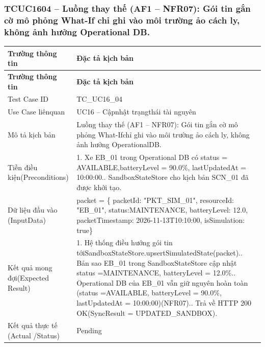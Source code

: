 \subsubsection{TCUC1604 – Luồng thay thế (AF1 – NFR07): Gói tin gắn cờ mô phỏng What-If chỉ ghi vào môi trường ảo cách ly, không ảnh hưởng Operational DB.}
\begin{longtable}{|L{0.24\textwidth}|L{0.70\textwidth}|}
\hline
\textbf{Trường thông tin} & \textbf{Đặc tả kịch bản} \\
\hline
\endfirsthead
\hline
\textbf{Trường thông tin} & \textbf{Đặc tả kịch bản} \\
\hline
\endhead
Test Case ID & TC\_UC16\_04 \\
\hline
Use Case liênquan & UC16 – Cậpnhật trạngthái tài nguyên \\
\hline
Mô tả kịch bản & Luồng thay thế (AF1 – NFR07): Gói tin gắn cờ mô phỏng What-If\newline chỉ ghi vào môi trường ảo cách ly, không ảnh hưởng Operational\newline DB. \\
\hline
Tiền điều kiện\newline (Preconditions) & 1. Xe EB\_01 trong Operational DB có status = AVAILABLE,\newline batteryLevel = 90.0\%, lastUpdatedAt = 10:00:00.. SandboxStateStore cho kịch bản SCN\_01 đã được khởi tạo. \\
\hline
Dữ liệu đầu vào (Input\newline Data) & packet = \{ packetId: "PKT\_SIM\_01", resourceId: "EB\_01", status:\newline MAINTENANCE, batteryLevel: 12.0, packetTimestamp: 2026-11-\newline 13T10:10:00, isSimulation: true\} \\
\hline
Kết quả mong đợi\newline (Expected Result) & 1. Hệ thống điều hướng gói tin tới\newline SandboxStateStore.upsertSimulatedState(packet).. Bản sao EB\_01 trong SandboxStateStore cập nhật status =\newline MAINTENANCE, batteryLevel = 12.0\%.. Operational DB của EB\_01 vẫn giữ nguyên hoàn toàn (status =\newline AVAILABLE, batteryLevel = 90.0\%, lastUpdatedAt = 10:00:00)\newline (NFR07).. Trả về HTTP 200 OK(SyncResult = UPDATED\_SANDBOX). \\
\hline
Kết quả thực tế (Actual /\newline Status) & Pending \\
\hline
\end{longtable}
\vspace{-0.5\baselineskip}
